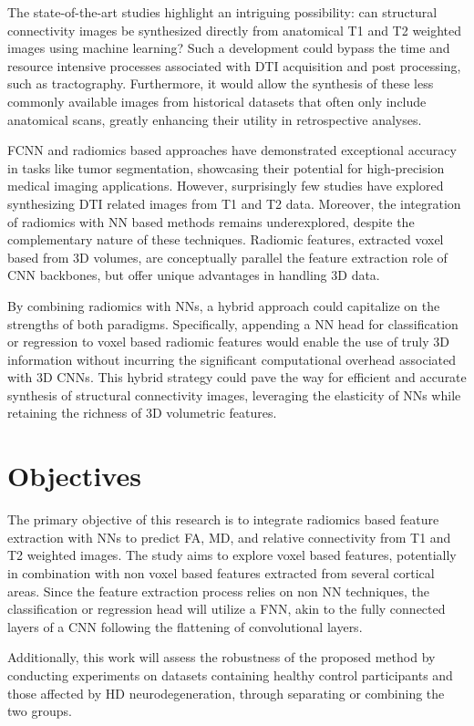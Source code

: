 The state-of-the-art studies highlight an intriguing possibility: can structural connectivity images be synthesized directly from anatomical T1 and T2 weighted images using machine learning? Such a development could bypass the time and resource intensive processes associated with \ac{DTI} acquisition and post processing, such as tractography. Furthermore, it would allow the synthesis of these less commonly available images from historical datasets that often only include anatomical scans, greatly enhancing their utility in retrospective analyses.\par
\ac{FCNN} and radiomics based approaches have demonstrated exceptional accuracy in tasks like tumor segmentation, showcasing their potential for high-precision medical imaging applications. However, surprisingly few studies have explored synthesizing \ac{DTI} related images from T1 and T2 data. Moreover, the integration of radiomics with \ac{NN} based methods remains underexplored, despite the complementary nature of these techniques. Radiomic features, extracted voxel based from 3D volumes, are conceptually parallel the feature extraction role of \ac{CNN} backbones, but offer unique advantages in handling 3D data.\par
By combining radiomics with \ac{NN}s, a hybrid approach could capitalize on the strengths of both paradigms. Specifically, appending a \ac{NN} head for classification or regression to voxel based radiomic features would enable the use of truly 3D information without incurring the significant computational overhead associated with 3D \ac{CNN}s. This hybrid strategy could pave the way for efficient and accurate synthesis of structural connectivity images, leveraging the elasticity of \ac{NN}s while retaining the richness of 3D volumetric features.

\section{Objectives}

The primary objective of this research is to integrate radiomics based feature extraction with \ac{NN}s to predict \ac{FA}, \ac{MD}, and relative connectivity from T1 and T2 weighted images. The study aims to explore voxel based features, potentially in combination with non voxel based features extracted from several cortical areas. Since the feature extraction process relies on non \ac{NN} techniques, the classification or regression head will utilize a \ac{FNN}, akin to the fully connected layers of a \ac{CNN} following the flattening of convolutional layers.\par
Additionally, this work will assess the robustness of the proposed method by conducting experiments on datasets containing healthy control participants and those affected by \ac{HD} neurodegeneration, through separating or combining the two groups.

